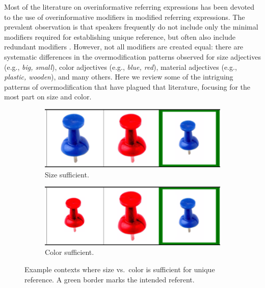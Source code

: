 \documentclass[11pt]{article}
\begin{document}
Most of the literature on overinformative referring expressions has been devoted to the use of overinformative modifiers in modified referring expressions. The prevalent observation is that speakers frequently do not include only the minimal modifiers required for establishing unique reference, but often also include redundant modifiers \cite{Pechmann1989, nadig2002,  Maes2004, Engelhardt2006, Arts2011, Koolen2011}. However, not all modifiers are created equal: there are systematic differences in the overmodification patterns observed for size adjectives (e.g., \emph{big, small}), color adjectives (e.g., \emph{blue, red}), material adjectives (e.g., \emph{plastic, wooden}), and many others. Here we review some of the intriguing patterns of overmodification that have plagued that literature, focusing for the most part on size and color.



\begin{figure}
\begin{subfigure}{.5\textwidth}
\includegraphics[width=\textwidth]{pics/size-sufficient.png}
\caption{Size sufficient.}
\label{fig:sizesufficient}
\end{subfigure}
\begin{subfigure}{.5\textwidth}
\includegraphics[width=\textwidth]{pics/color-sufficient.png}
\caption{Color sufficient.}
\label{fig:colorsufficient}
\end{subfigure}
\caption{Example contexts where size vs.~color is sufficient for unique reference. A green border marks the intended referent.}
\label{fig:thumbtack}
\end{figure}
\end{document}
